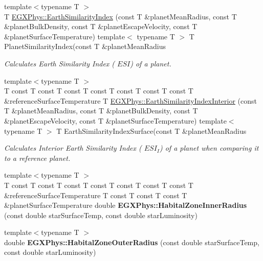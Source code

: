 \begin{DoxyCompactItemize}
{\footnotesize template$<$typename T $>$ }\\T \hyperlink{group___astrophysics_ga057eb762bee8c3c74390eefc42589f12}{E\+G\+X\+Phys\+::\+Earth\+Similarity\+Index} (const T \&planet\+Mean\+Radius, const T \&planet\+Bulk\+Density, const T \&planet\+Escape\+Velocity, const T \&planet\+Surface\+Temperature) template$<$ typename T $>$ T Planet\+Similarity\+Index(const T \&planet\+Mean\+Radius
\begin{DoxyCompactList}\small\item\em Calculates Earth Similarity Index ( $ESI$) of a planet. \end{DoxyCompactList}\item 
{\footnotesize template$<$typename T $>$ }\\T const T const T const T const T const T const T const T \&reference\+Surface\+Temperature T \hyperlink{group___astrophysics_ga9e293828a04cd099bfa7c3ca1b1ea850}{E\+G\+X\+Phys\+::\+Earth\+Similarity\+Index\+Interior} (const T \&planet\+Mean\+Radius, const T \&planet\+Bulk\+Density, const T \&planet\+Escape\+Velocity, const T \&planet\+Surface\+Temperature) template$<$ typename T $>$ T Earth\+Similarity\+Index\+Surface(const T \&planet\+Mean\+Radius
\begin{DoxyCompactList}\small\item\em Calculates Interior Earth Similarity Index ( $ESI_I$) of a planet when comparing it to a reference planet. \end{DoxyCompactList}\item 
\mbox{\label{group___astrophysics_gaa036b2bd461dc3b7dd777b550b9beb4b}} 
{\footnotesize template$<$typename T $>$ }\\T const T const T const T const T const T const T const T \&reference\+Surface\+Temperature T const T const T const T \&planet\+Surface\+Temperature double {\bfseries E\+G\+X\+Phys\+::\+Habital\+Zone\+Inner\+Radius} (const double star\+Surface\+Temp, const double star\+Luminosity)
\item 
\mbox{\label{group___astrophysics_gacdb0f5c44bfad08164ae26b5b098be45}} 
{\footnotesize template$<$typename T $>$ }\\double {\bfseries E\+G\+X\+Phys\+::\+Habital\+Zone\+Outer\+Radius} (const double star\+Surface\+Temp, const double star\+Luminosity)
\item 
\mbox{\label{group___astrophysics_ga227538d5ee00f66a5524a1daafd8dc26}} 

\end{DoxyCompactItemize}

